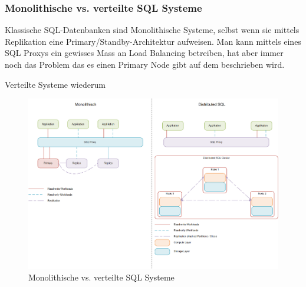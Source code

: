 
\subsubsection{Monolithische vs. verteilte SQL Systeme}
Klassische SQL-Datenbanken sind Monolithische Systeme, selbst wenn sie mittels Replikation eine Primary/Standby-Architektur aufweisen.
Man kann mittels eines SQL Proxys ein gewisses Mass an Load Balancing betreiben, hat aber immer noch das Problem das es einen Primary Node gibt auf dem beschrieben wird.

Verteilte Systeme wiederum

\begin{figure}[H]
    \centering
    \includegraphics[width=1\linewidth]{source/implementation/evaluation/excursus_architecture/monolith_distributed}
    \caption{Monolithische vs. verteilte SQL Systeme}
    \label{fig:Monolith_vs_Distributed_SQL}
\end{figure}
